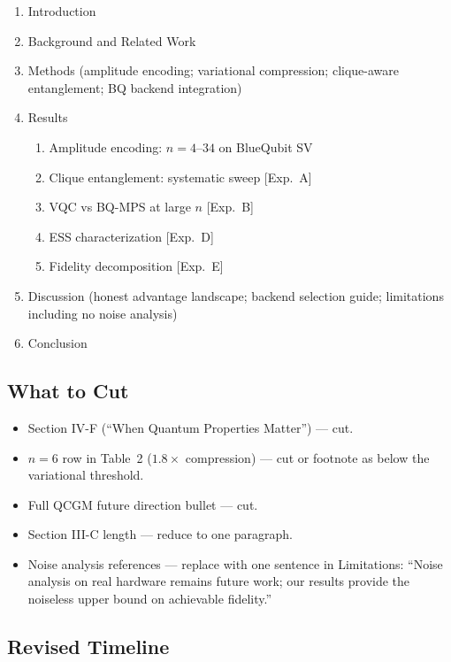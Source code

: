 \documentclass[11pt]{article}
\begin{document}
\begin{enumerate}[label=\Roman*.]
  \item Introduction
  \item Background and Related Work
  \item Methods (amplitude encoding; variational compression;
        clique-aware entanglement; BQ backend integration)
  \item Results
    \begin{enumerate}[label=\Alph*.]
      \item Amplitude encoding: $n = 4$--$34$ on BlueQubit SV
      \item Clique entanglement: systematic sweep [Exp.~A]
      \item VQC vs BQ-MPS at large $n$ [Exp.~B]
      \item ESS characterization [Exp.~D]
      \item Fidelity decomposition [Exp.~E]
    \end{enumerate}
  \item Discussion (honest advantage landscape; backend selection
        guide; limitations including no noise analysis)
  \item Conclusion
\end{enumerate}

\subsection{What to Cut}

\begin{itemize}
  \item Section IV-F (``When Quantum Properties Matter'') --- cut.
  \item $n=6$ row in Table~2 ($1.8\times$ compression) --- cut or
        footnote as below the variational threshold.
  \item Full QCGM future direction bullet --- cut.
  \item Section III-C length --- reduce to one paragraph.
  \item Noise analysis references --- replace with one sentence in
        Limitations: ``Noise analysis on real hardware remains
        future work; our results provide the noiseless upper bound
        on achievable fidelity.''
\end{itemize}

\subsection{Revised Timeline}
\end{document}
